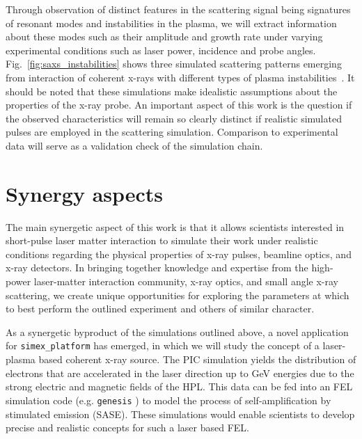\documentclass[10pt]{scrartcl}
\begin{document}
Through observation of distinct features in the
scattering signal being signatures of resonant modes and instabilities in the
plasma, we will extract information about these modes such as their amplitude
and growth rate under varying experimental conditions such as laser power,
incidence and probe angles. Fig.~\ref{fig:saxs_instabilities} shows three
simulated scattering patterns emerging from interaction of coherent x-rays with
different types of plasma instabilities~\cite{Kluge2014}.
It should be noted that these simulations make idealistic assumptions about the
properties of the x-ray probe. An important aspect of this work is the question
if the observed characteristics will remain so clearly distinct if realistic
simulated pulses are employed in the scattering simulation. Comparison to experimental
data will serve as a validation check of the simulation chain.

\section{Synergy aspects}

The main synergetic aspect of this work is that it allows scientists interested
in short-pulse laser matter interaction to simulate their work under realistic
conditions regarding the physical properties of x-ray pulses, beamline optics,
and x-ray detectors.
In bringing together knowledge and expertise from the high-power
laser-matter interaction community, x-ray optics, and small angle x-ray
scattering, we create unique opportunities for exploring the parameters
at which to best perform the outlined experiment and others of similar character.

As a synergetic byproduct of the simulations outlined above, a
novel application for \texttt{simex\_platform} has emerged,
in which we will
study the concept of a laser-plasma based coherent x-ray source. The PIC
simulation yields the distribution of electrons that are accelerated in the
laser direction up to GeV energies due to the strong electric and
magnetic fields of the HPL. This data can be fed into an FEL simulation code
(e.g. \texttt{genesis} \cite{Reiche1999}) to model the process of
self-amplification by stimulated emission (SASE). These simulations would enable
scientists to develop precise and realistic concepts for such a laser based FEL.
\end{document}
